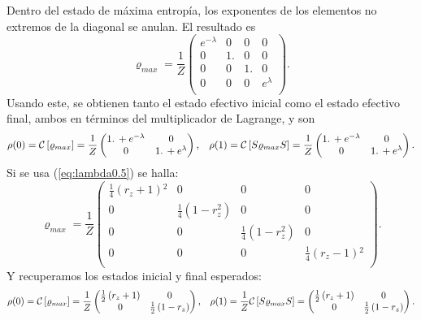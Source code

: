 Dentro del estado de máxima entropía, los exponentes de los elementos no extremos de la diagonal se anulan. El resultado es
\begin{equation}
\varrho_{max}=\frac{1}{Z}
\begin{pmatrix}
 e^{-\lambda } & 0 & 0 & 0 \\
 0 & 1. & 0 & 0 \\
 0 & 0 & 1. & 0 \\
 0 & 0 & 0 & e^{\lambda } \\
\end{pmatrix}.
\end{equation}
Usando este, se obtienen tanto el estado efectivo inicial como el estado efectivo final, ambos en términos del multiplicador de Lagrange, y son
\begin{align}
\rho(0)=\mathcal{C}\left[\varrho_{max}\right]=\frac{1}{Z}
\begin{pmatrix}
 1.\, +e^{-\lambda } & 0 \\
 0 & 1.\, +e^{\lambda } \\
\end{pmatrix}, && \rho(1)=\mathcal{C}\left[S\varrho_{max} S\right]=\frac{1}{Z}
\begin{pmatrix}
 1.\, +e^{-\lambda } & 0 \\
 0 & 1.\, +e^{\lambda } \\
\end{pmatrix}.
\end{align}
Si se usa (\ref{eq:lambda0.5}) se halla:
\begin{equation}
\varrho_{max}=\frac{1}{Z}
\begin{pmatrix}
 \frac{1}{4} \left(r_z+1\right){}^2 & 0 & 0 & 0 \\
 0 & \frac{1}{4} \left(1-r_z^2\right) & 0 & 0 \\
 0 & 0 & \frac{1}{4} \left(1-r_z^2\right) & 0 \\
 0 & 0 & 0 & \frac{1}{4} \left(r_z-1\right){}^2 \\
\end{pmatrix}.
\end{equation}
Y recuperamos los estados inicial y final esperados:
\begin{align}
\rho(0)=\mathcal{C}\left[\varrho_{max}\right]=\frac{1}{Z}\begin{pmatrix}
 \frac{1}{2} \left(r_z+1\right) & 0 \\
 0 & \frac{1}{2} \left(1-r_z\right) \\
\end{pmatrix}, && \rho(1)=\frac{1}{Z}\mathcal{C}\left[S\varrho_{max} S\right]=
\begin{pmatrix}
 \frac{1}{2} \left(r_z+1\right) & 0 \\
 0 & \frac{1}{2} \left(1-r_z\right) \\
\end{pmatrix}.
\end{align}